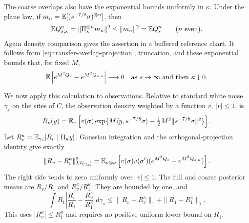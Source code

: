 The coarse overlaps also have the exponential bounds uniformly in
$\kappa$.  Under the plane law, if
$m_n=\mathbb E[(s^{-7/8}\sigma)^{\otimes n}]$, then
\[
 \mathbb E Q_{s,\kappa}^n
 =\|\Pi_\kappa^{\otimes n}m_n\|^2\leq\|m_n\|^2
 =\mathbb E Q_s^n\qquad(n\text{ even}).
\]
Again density comparison gives the assertion in a buffered reference
chart.  It follows from \eqref{eq:transfer-overlap-projection}, truncation,
and these exponential bounds that, for fixed $M$,
\begin{equation}
 \mathbb E\left|e^{M^2Q_s}-e^{M^2Q_{s,\kappa}}\right|\longrightarrow0
 \quad\text{as }s\to\infty\text{ and then }\kappa\downarrow0.
 \label{eq:transfer-exponential-projection}
\end{equation}

We now apply this calculation to observations.  Relative to standard
white noise $\gamma_s$ on the sites of $C$, the observation density
weighted by a function $v$, $|v|\leq1$, is
\[
 R_v(y)=\mathbb E_\nu\left[v(\sigma)
  \exp\{M\langle y,s^{-7/8}\sigma\rangle
        -\tfrac12M^2\|s^{-7/8}\sigma\|^2\}\right].
\]
Let $R_v^\kappa=\mathbb E_{\gamma_s}[R_v\mid\Pi_\kappa y]$.  Gaussian
integration and the orthogonal-projection identity give exactly
\begin{equation}
 \|R_v-R_v^\kappa\|_{L^2(\gamma_s)}^2
 =\mathbb E_{\nu\otimes\nu}\left[v(\sigma)v(\sigma')
      (e^{M^2Q_s}-e^{M^2Q_{s,\kappa}})\right].
 \label{eq:transfer-output-density}
\end{equation}
The right side tends to zero uniformly over $|v|\leq1$.
The full and coarse posterior means are $R_v/R_1$ and
$R_v^\kappa/R_1^\kappa$.  They are bounded by one, and
\begin{equation}
 \int R_1\left|\frac{R_v}{R_1}
       -\frac{R_v^\kappa}{R_1^\kappa}\right|d\gamma_s
 \leq\|R_v-R_v^\kappa\|_1+\|R_1-R_1^\kappa\|_1.
 \label{eq:transfer-ratio}
\end{equation}
This uses $|R_v^\kappa|\leq R_1^\kappa$ and requires no positive
uniform lower bound on $R_1$.

